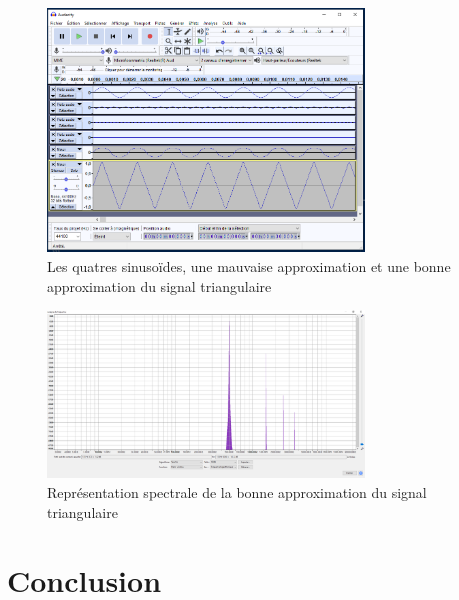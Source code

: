 \documentclass[a4paper]{article}
\begin{document}

\begin{figure}[H]
    \centering
    \includegraphics[width=0.75\textwidth]{images/SignalPerso001.PNG}
    \caption{Les quatres sinusoïdes, une mauvaise approximation et une bonne approximation du signal triangulaire}
    \label{fig:SignalPerso001}
\end{figure}

\begin{figure}[H]
    \centering
    \includegraphics[width=0.75\textwidth]{images/SignalPerso003.PNG}
    \caption{Représentation spectrale de la bonne approximation du signal triangulaire}
    \label{fig:SignalPerso003}
\end{figure}
















\section{Conclusion}
\end{document}

